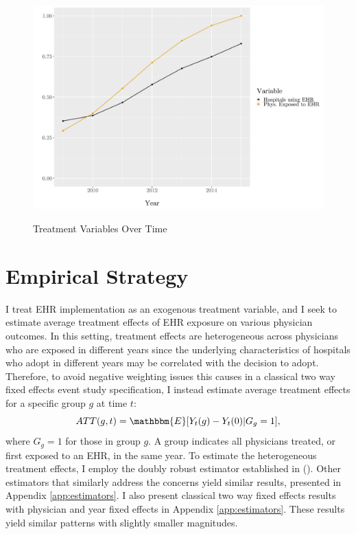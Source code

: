 \documentclass[11pt]{article}
\begin{document}
\begin{figure}[t]
\centering
    \caption{Treatment Variables Over Time}
    \includegraphics[scale=.45]{Objects/sum_stats_year.pdf}
    \label{fig:treatmentgraph}
\end{figure}



\section{Empirical Strategy}

I treat EHR implementation as an exogenous treatment variable, and I seek to estimate average treatment effects of EHR exposure on various physician outcomes. In this setting, treatment effects are heterogeneous across physicians who are exposed in different years since the underlying characteristics of hospitals who adopt in different years may be correlated with the decision to adopt. Therefore, to avoid negative weighting issues this causes in a classical two way fixed effects event study specification, I instead estimate average treatment effects for a specific group $g$ at time $t$: 
$$ATT(g,t)=\mathbbm{E}[Y_t(g)-Y_t(0)|G_g=1],$$
where $G_g=1$ for those in group $g$. A group indicates all physicians treated, or first exposed to an EHR, in the same year. To estimate the heterogeneous treatment effects, I employ the doubly robust estimator established in \citeauthor{callaway2021difference} (\citeyear{callaway2021difference}). Other estimators that similarly address the concerns yield similar results, presented in Appendix \ref{app:estimators}. I also present classical two way fixed effects results with physician and year fixed effects in Appendix \ref{app:estimators}. These results yield similar patterns with slightly smaller magnitudes. 
\end{document}
